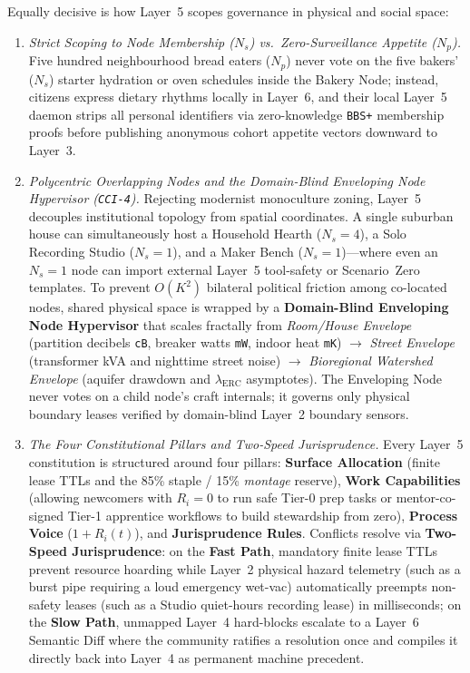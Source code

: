 Equally decisive is how Layer~5 scopes governance in physical and social space:
\begin{enumerate}
  \item \textit{Strict Scoping to Node Membership ($N_s$) vs.\ Zero-Surveillance Appetite ($N_p$).} Five hundred neighbourhood bread eaters ($N_p$) never vote on the five bakers' ($N_s$) starter hydration or oven schedules inside the Bakery Node; instead, citizens express dietary rhythms locally in Layer~6, and their local Layer~5 daemon strips all personal identifiers via zero-knowledge \texttt{BBS+} membership proofs before publishing anonymous cohort appetite vectors downward to Layer~3.
  \item \textit{Polycentric Overlapping Nodes and the Domain-Blind Enveloping Node Hypervisor (\texttt{CCI-4}).} Rejecting modernist monoculture zoning, Layer~5 decouples institutional topology from spatial coordinates. A single suburban house can simultaneously host a Household Hearth ($N_s=4$), a Solo Recording Studio ($N_s=1$), and a Maker Bench ($N_s=1$)---where even an $N_s=1$ node can import external Layer~5 tool-safety or Scenario~Zero templates. To prevent $O(K^2)$ bilateral political friction among co-located nodes, shared physical space is wrapped by a \textbf{Domain-Blind Enveloping Node Hypervisor} that scales fractally from \textit{Room/House Envelope} (partition decibels \texttt{cB}, breaker watts \texttt{mW}, indoor heat \texttt{mK}) $\to$ \textit{Street Envelope} (transformer kVA and nighttime street noise) $\to$ \textit{Bioregional Watershed Envelope} (aquifer drawdown and $\lambda_{\mathrm{ERC}}$ asymptotes). The Enveloping Node never votes on a child node's craft internals; it governs only physical boundary leases verified by domain-blind Layer~2 boundary sensors.
  \item \textit{The Four Constitutional Pillars and Two-Speed Jurisprudence.} Every Layer~5 constitution is structured around four pillars: \textbf{Surface Allocation} (finite lease TTLs and the 85\% staple / 15\% \textit{montage} reserve), \textbf{Work Capabilities} (allowing newcomers with $R_i = 0$ to run safe Tier-0 prep tasks or mentor-co-signed Tier-1 apprentice workflows to build stewardship from zero), \textbf{Process Voice} ($1 + R_i(t)$), and \textbf{Jurisprudence Rules}. Conflicts resolve via \textbf{Two-Speed Jurisprudence}: on the \textbf{Fast Path}, mandatory finite lease TTLs prevent resource hoarding while Layer~2 physical hazard telemetry (such as a burst pipe requiring a loud emergency wet-vac) automatically preempts non-safety leases (such as a Studio quiet-hours recording lease) in milliseconds; on the \textbf{Slow Path}, unmapped Layer~4 hard-blocks escalate to a Layer~6 Semantic Diff where the community ratifies a resolution once and compiles it directly back into Layer~4 as permanent machine precedent.
\end{enumerate}

